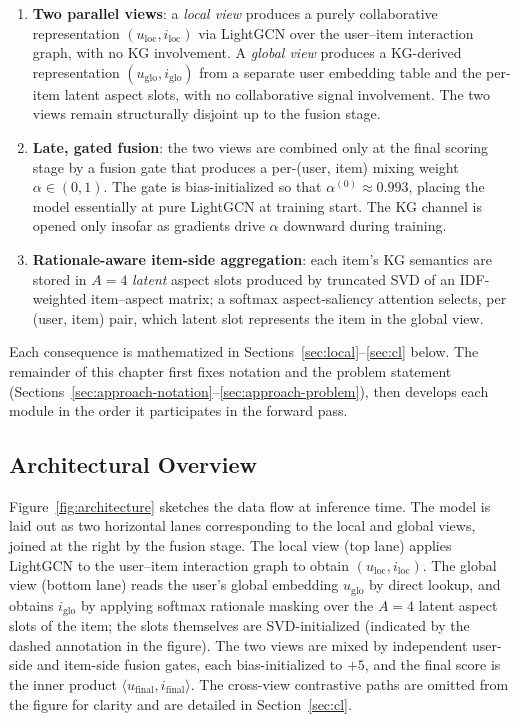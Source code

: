 \begin{enumerate}
  \item \textbf{Two parallel views}: a \emph{local view} produces a purely collaborative representation $(u_{\mathrm{loc}}, i_{\mathrm{loc}})$ via LightGCN over the user--item interaction graph, with no KG involvement. A \emph{global view} produces a KG-derived representation $(u_{\mathrm{glo}}, i_{\mathrm{glo}})$ from a separate user embedding table and the per-item latent aspect slots, with no collaborative signal involvement. The two views remain structurally disjoint up to the fusion stage.
  \item \textbf{Late, gated fusion}: the two views are combined only at the final scoring stage by a fusion gate that produces a per-(user, item) mixing weight $\alpha \in (0, 1)$. The gate is bias-initialized so that $\alpha^{(0)} \approx 0.993$, placing the model essentially at pure LightGCN at training start. The KG channel is opened only insofar as gradients drive $\alpha$ downward during training.
  \item \textbf{Rationale-aware item-side aggregation}: each item's KG semantics are stored in $A=4$ \emph{latent} aspect slots produced by truncated SVD of an IDF-weighted item--aspect matrix; a softmax aspect-saliency attention selects, per (user, item) pair, which latent slot represents the item in the global view.
\end{enumerate}

Each consequence is mathematized in Sections~\ref{sec:local}--\ref{sec:cl} below. The remainder of this chapter first fixes notation and the problem statement (Sections~\ref{sec:approach-notation}--\ref{sec:approach-problem}), then develops each module in the order it participates in the forward pass.

\subsection{Architectural Overview}
\label{sec:approach-overview}

Figure~\ref{fig:architecture} sketches the data flow at inference time. The model is laid out as two horizontal lanes corresponding to the local and global views, joined at the right by the fusion stage. The local view (top lane) applies LightGCN to the user--item interaction graph to obtain $(u_{\mathrm{loc}}, i_{\mathrm{loc}})$. The global view (bottom lane) reads the user's global embedding $u_{\mathrm{glo}}$ by direct lookup, and obtains $i_{\mathrm{glo}}$ by applying softmax rationale masking over the $A=4$ latent aspect slots of the item; the slots themselves are SVD-initialized (indicated by the dashed annotation in the figure). The two views are mixed by independent user-side and item-side fusion gates, each bias-initialized to $+5$, and the final score is the inner product $\langle u_{\mathrm{final}}, i_{\mathrm{final}} \rangle$. The cross-view contrastive paths are omitted from the figure for clarity and are detailed in Section~\ref{sec:cl}.

